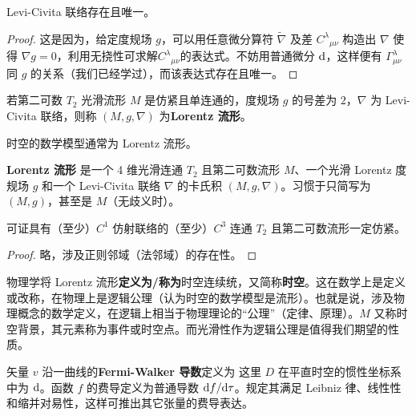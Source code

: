 \begin{theorem}
    Levi-Civita 联络存在且唯一。
\end{theorem}
\begin{proof}
    这是因为，给定度规场 $g$，可以用任意微分算符 $\tilde\nabla$ 及差 $C^\lambda{}_{\mu\nu}$ 构造出 $\nabla$ 使得 $\nabla g=0$，利用无挠性可求解$C^\lambda{}_{\mu\nu}$的表达式。不妨用普通微分 $\dd$，这样便有 $\Gamma^\lambda_{\mu\nu}$ 同 $g$ 的关系（我们已经学过），而该表达式存在且唯一。
\end{proof}

\begin{definition}
    若第二可数 $T_2$ 光滑流形 $M$ 是仿紧且单连通的，度规场 $g$ 的号差为 $2$，$\nabla$ 为 Levi-Civita 联络，则称 $(M,g,\nabla)$ 为\textbf{Lorentz 流形}。
\end{definition}

\begin{remark}
    时空的数学模型通常为 Lorentz 流形。
\end{remark}

\begin{definition}
    \textbf{Lorentz 流形} 是一个 4 维光滑连通 $T_2$ 且第二可数流形 $M$、一个光滑 Lorentz 度规场 $g$ 和一个 Levi-Civita 联络 $\nabla$ 的卡氏积 $(M,g,\nabla)$。习惯于只简写为 $(M,g)$，甚至是 $M$（无歧义时）。
\end{definition}

\begin{theorem}
    可证具有（至少）$C^1$ 仿射联络的（至少）$C^3$ 连通 $T_2$ 且第二可数流形一定仿紧。
\end{theorem}
\begin{proof}
    略，涉及正则邻域（法邻域）的存在性。
\end{proof}

物理学将 Lorentz 流形\textbf{定义为/称为}时空连续统，又简称\textbf{时空}。这在数学上是定义或改称，在物理上是逻辑公理（认为时空的数学模型是流形）。也就是说，涉及物理概念的数学定义，在逻辑上相当于物理理论的“公理”（定律、原理）。$M$ 又称时空背景，其元素称为事件或时空点。而光滑性作为逻辑公理是值得我们期望的性质。

\begin{definition}
    矢量 $v$ 沿一曲线的\textbf{Fermi-Walker 导数}定义为
    这里 $D$ 在平直时空的惯性坐标系中为 $\dd$。函数 $f$ 的费导定义为普通导数 $\dd f/\dd\tau$。规定其满足 Leibniz 律、线性性和缩并对易性，这样可推出其它张量的费导表达。
\end{definition}


